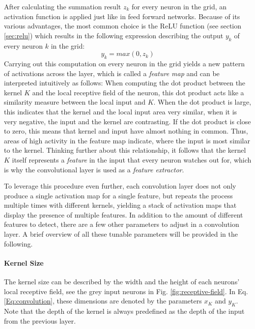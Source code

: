After calculating the summation result \(z_k\) for every neuron in the
grid, an activation function is applied just like in feed forward
networks. Because of its various advantages, the most common choice is
the ReLU function (see section \ref{sec:relu}) which results in the
following expression describing the
output \(y_k\) of every neuron \(k\) in the grid:
\begin{equation}
  y_k = max(0, z_k)
\end{equation}
Carrying out this computation on every neuron in the
grid yields a new pattern of activations across the layer, which is
called a \textit{feature map} and can be interpreted intuitively as
follows: When computing the dot product between the kernel \(K\) and
the local receptive field of the neuron, this dot product acts like a
similarity measure between the local input and \(K\). When the dot
product is large, this indicates that the kernel and the local input
area very similar, when it is very negative, the input and the kernel
are contrasting. If the dot product is close to zero, this means that
kernel and input have almost nothing in common. Thus, areas of high
activity in the feature map indicate, where the input is most similar
to the kernel. Thinking further about this relationship, it follows
that the kernel \(K\) itself represents a \textit{feature} in the
input that every neuron watches out for, which is why the
convolutional layer is used as a \textit{feature extractor}.

To leverage this procedure even further, each convolution layer does
not only produce a single activation map for a single feature, but
repeats the process multiple times with different kernels, yielding a
stack of activation maps that display the presence of multiple
features. In addition to the amount of different features to detect,
there are a few other parameters to adjust in a convolution layer.
A brief overview of all these tunable parameters will be provided in
the following.

\paragraph{Kernel Size}

The kernel size can be described by the width and the height of each
neurons' local receptive field, see the grey input neurons in
Fig. \ref{fig:receptive-field}. In Eq. \ref{Eq:convolution}, these
dimensions are denoted by the parameters \(x_K\) and \(y_K\). Note that
the depth of the kernel is always predefined as the depth of the input
from the previous layer.

